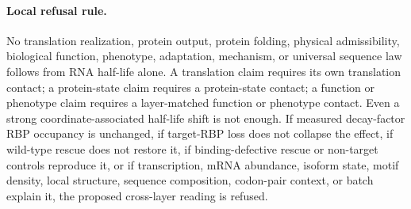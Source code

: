 \paragraph{Local refusal rule.} No translation realization, protein output, protein folding, physical admissibility, biological function, phenotype, adaptation, mechanism, or universal sequence law follows from RNA half-life alone. A translation claim requires its own translation contact; a protein-state claim requires a protein-state contact; a function or phenotype claim requires a layer-matched function or phenotype contact. Even a strong coordinate-associated half-life shift is not enough. If measured decay-factor RBP occupancy is unchanged, if target-RBP loss does not collapse the effect, if wild-type rescue does not restore it, if binding-defective rescue or non-target controls reproduce it, or if transcription, mRNA abundance, isoform state, motif density, local structure, sequence composition, codon-pair context, or batch explain it, the proposed cross-layer reading is refused.
